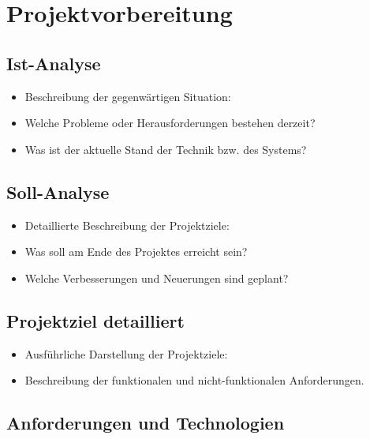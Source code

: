 
\section{Projektvorbereitung}\label{projektvorbereitung}

\subsection{Ist-Analyse}\label{ist-analyse}

\begin{itemize}
  \item
        Beschreibung der gegenwärtigen Situation:
  \item
        Welche Probleme oder Herausforderungen bestehen derzeit?
  \item
        Was ist der aktuelle Stand der Technik bzw. des Systems?
\end{itemize}

\subsection{Soll-Analyse}\label{soll-analyse}

\begin{itemize}
  \item
        Detaillierte Beschreibung der Projektziele:
  \item
        Was soll am Ende des Projektes erreicht sein?
  \item
        Welche Verbesserungen und Neuerungen sind geplant?
\end{itemize}

\subsection{Projektziel detailliert}\label{projektziel-detailliert}

\begin{itemize}
  \item
        Ausführliche Darstellung der Projektziele:
  \item
        Beschreibung der funktionalen und nicht-funktionalen Anforderungen.
\end{itemize}

\subsection{Anforderungen und Technologien}\label{anforderungen-und-technologien}

